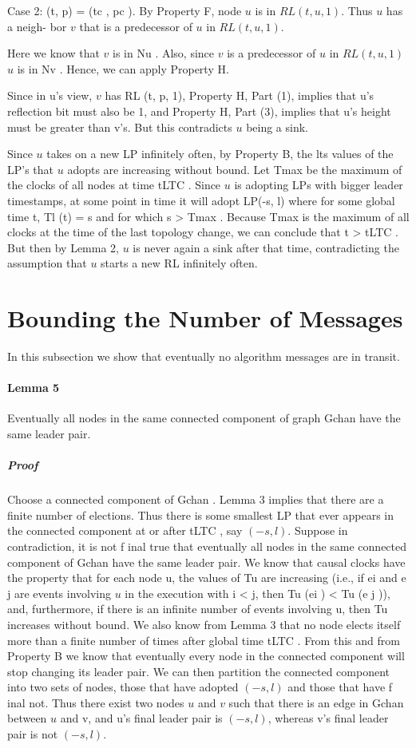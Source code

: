 Case 2: (t, p) = (tc , pc ). By Property F, node $u$ is in $RL (t, u, 1)$. Thus $u$ has a neigh- bor $v$ that is a predecessor of $u$ in $RL (t, u, 1)$.

Here we know that $v$ is in Nu . Also, since $v$ is a predecessor of $u$ in $RL (t, u, 1)$ $u$ is in Nv . Hence, we can apply Property H.

Since in u’s view, $v$ has RL (t, p, 1), Property H, Part (1), implies that u’s reflection bit must also be 1, and Property H, Part (3), implies that u’s height must be greater than v’s. But this contradicts $u$ being a sink.

Since $u$ takes on a new LP infinitely often, by Property B, the lts values of the LP’s that $u$ adopts are increasing without bound. Let Tmax be the maximum of the clocks of all nodes at time tLTC . Since $u$ is adopting LPs with bigger leader timestamps, at some point in time it will adopt LP(-s, l) where for some global time t, Tl (t) = s and for which s > Tmax . Because Tmax is the maximum of all clocks at the time of the last topology change, we can conclude that t > tLTC . But then by Lemma 2, $u$ is never again a sink after that time, contradicting the assumption that $u$ starts a new RL infinitely often.
\section{Bounding the Number of Messages}
In this subsection we show that eventually no algorithm messages are in transit.
\paragraph{Lemma 5} Eventually all nodes in the same connected component of graph Gchan have the same leader pair.
\subparagraph{Proof}Choose a connected component of Gchan . Lemma 3 implies that there are a finite number of elections. Thus there is some smallest LP that ever appears in the connected component at or after tLTC , say $(-s, l)$. Suppose in contradiction, it is not f inal true that eventually all nodes in the same connected component of Gchan have the same leader pair. We know that causal clocks have the property that for each node u, the values of Tu are increasing (i.e., if ei and e j are events involving $u$ in the execution with i < j, then Tu (ei ) < Tu (e j )), and, furthermore, if there is an infinite number of events involving u, then Tu increases without bound. We also know from Lemma 3 that no node elects itself more than a finite number of times after global time tLTC . From this and from Property B we know that eventually every node in the connected component will stop changing its leader pair. We can then partition the connected component into two sets of nodes, those that have adopted $(-s, l)$ and those that have f inal not. Thus there exist two nodes $u$ and $v$ such that there is an edge in Gchan between $u$ and v, and u’s final leader pair is $(-s, l)$, whereas v’s final leader pair is not $(-s, l)$.

